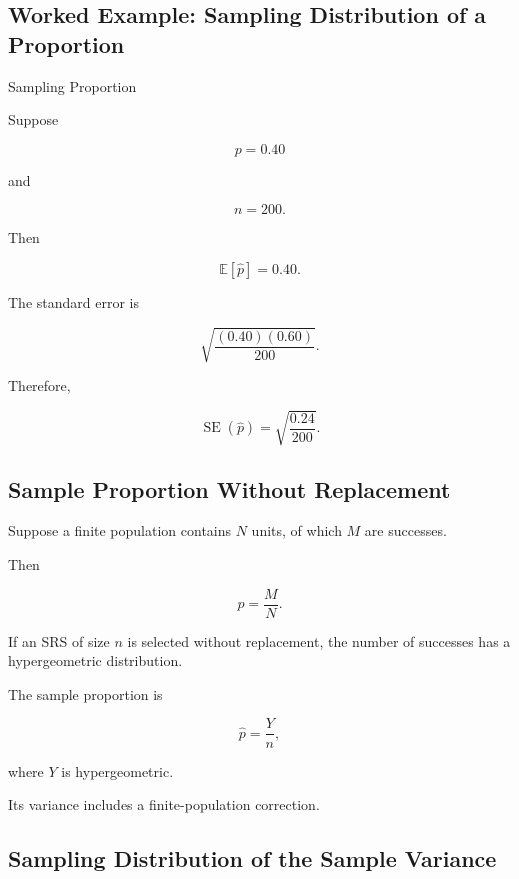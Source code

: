 \subsection{Worked Example: Sampling Distribution of a Proportion}
\label{subsec:worked-sampling-proportion}

\begin{workedexamplebox}{Sampling Proportion}

Suppose

\[
p=0.40
\]

and

\[
n=200.
\]

Then

\[
\mathbb{E}[\widehat{p}]
=
0.40.
\]

The standard error is

\[
\sqrt{
\frac{
(0.40)(0.60)
}{200}
}.
\]

Therefore,

\begin{answerbox}
\[
\boxed{
\operatorname{SE}(\widehat{p})
=
\sqrt{
\frac{0.24}{200}
}.
}
\]
\end{answerbox}

\end{workedexamplebox}

\subsection{Sample Proportion Without Replacement}
\label{subsec:sample-proportion-finite-population}

Suppose a finite population contains \(N\) units, of which \(M\) are
successes.

Then

\[
p
=
\frac MN.
\]

If an SRS of size \(n\) is selected without replacement, the number of
successes has a hypergeometric distribution.

The sample proportion is

\[
\widehat{p}
=
\frac Yn,
\]

where \(Y\) is hypergeometric.

Its variance includes a finite-population correction.

\subsection{Sampling Distribution of the Sample Variance}
\label{subsec:sampling-distribution-sample-variance}

